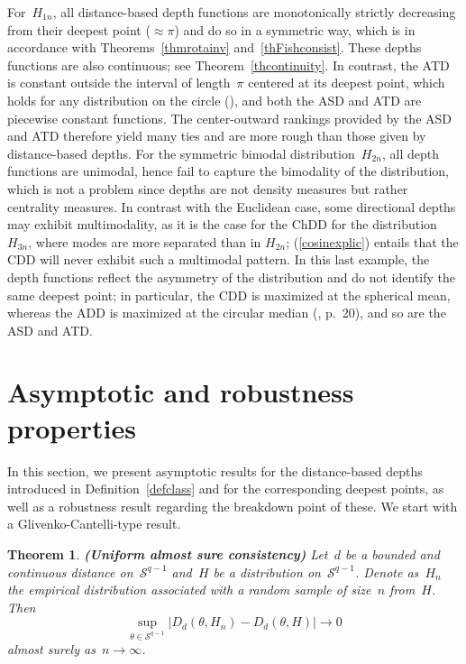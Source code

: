 \documentclass[usenames,dvipsnames]{article}
\newtheorem{thm}{Theorem}
\begin{document}
For~$H_{1n}$, all distance-based depth functions are monotonically strictly decreasing from their deepest point ($\approx \pi$) and do so in a symmetric way, which is in accordance with Theorems~\ref{thmrotainv} and~\ref{thFishconsist}. These depths functions are also continuous; see Theorem~\ref{thcontinuity}. In contrast, the ATD is constant outside the interval of length~$\pi$ centered at its deepest point, which holds for any distribution on the circle (\citealp[Proposition~4.6.]{LiuSin1992}), and both the ASD and ATD are piecewise constant functions. The center-outward rankings provided by the ASD and ATD therefore yield many ties and are more rough than those given by distance-based depths.  
%
For the symmetric bimodal distribution~$H_{2n}$, all depth functions are unimodal, hence fail to capture the bimodality of the distribution, which is not a problem since depths are not density measures but rather centrality measures. 
In contrast with the Euclidean case, some directional depths may exhibit multimodality, as it is the case for the ChDD for the distribution $H_{3n}$, where modes are more separated than in $H_{2n}$; (\ref{cosinexplic}) entails that the CDD will never exhibit such a multimodal pattern. In this last example, the depth functions reflect the asymmetry of the distribution and do not identify the same deepest point; in particular, the CDD is maximized at the spherical mean, whereas the ADD is maximized at the circular median (\citealp{MarJup2000}, p.~20), and so are the ASD and ATD.  



\section{Asymptotic and robustness properties}
\label{sec:DistrProperties}

In this section, we present asymptotic results for the distance-based depths introduced in Definition~\ref{defclass} and for the corresponding deepest points, as well as a robustness result regarding the breakdown point of these. We start with a Glivenko-Cantelli-type result. 

\begin{thm}{\textbf{(Uniform almost sure consistency)}} 
\label{thunifconsistency}
Let~$d$ be a bounded and continuous distance on~$\mathcal{S}^{q-1}$ and~$H$ be a distribution on~$\mathcal{S}^{q-1}$. Denote as~$H_n$ the empirical distribution associated with a random sample of size~$n$ from~$H$. Then 
$$
\sup_{\theta\in\mathcal{S}^{q-1}} 
\big|D_{d}(\theta, H_n)-D_{d}(\theta, H)\big|
\to 
0
$$
almost surely as~$n\to\infty$. 
\end{thm}
\end{document}
